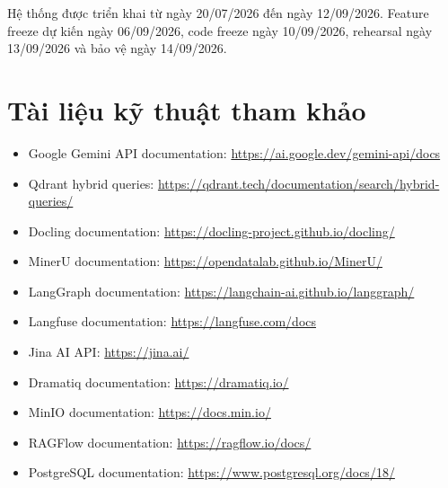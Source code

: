 \documentclass[12pt,a4paper]{article}
\begin{document}
Hệ thống được triển khai từ ngày 20/07/2026 đến ngày 12/09/2026. Feature freeze dự kiến ngày 06/09/2026, code freeze ngày 10/09/2026, rehearsal ngày 13/09/2026 và bảo vệ ngày 14/09/2026.

\section{Tài liệu kỹ thuật tham khảo}

\begin{sloppypar}
\begin{itemize}
  \item Google Gemini API documentation:
  \url{https://ai.google.dev/gemini-api/docs}
  \item Qdrant hybrid queries:
  \url{https://qdrant.tech/documentation/search/hybrid-queries/}
  \item Docling documentation:
  \url{https://docling-project.github.io/docling/}
  \item MinerU documentation:
  \url{https://opendatalab.github.io/MinerU/}
  \item LangGraph documentation:
  \url{https://langchain-ai.github.io/langgraph/}
  \item Langfuse documentation:
  \url{https://langfuse.com/docs}
  \item Jina AI API:
  \url{https://jina.ai/}
  \item Dramatiq documentation:
  \url{https://dramatiq.io/}
  \item MinIO documentation:
  \url{https://docs.min.io/}
  \item RAGFlow documentation:
  \url{https://ragflow.io/docs/}
  \item PostgreSQL documentation:
  \url{https://www.postgresql.org/docs/18/}
\end{itemize}
\end{sloppypar}
\end{document}
